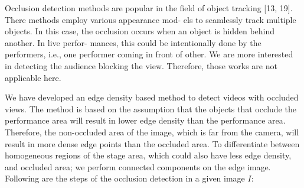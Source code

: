 \documentclass{new}
\begin{document}
Occlusion detection methods are popular in the field of object
tracking [13, 19]. There methods employ various appearance mod-
els to seamlessly track multiple objects. In this case, the occlusion
occurs when an object is hidden behind another. In live perfor-
mances, this could be intentionally done by the performers, i.e.,
one performer coming in front of other. We are more interested in
detecting the audience blocking the view. Therefore, those works
are not applicable here.

We have developed an edge density based method to detect videos
with occluded views. The method is based on the assumption that
the objects that occlude the performance area will result in lower
edge density than the performance area. Therefore, the non-occluded
area of the image, which is far from the camera, will result in more
dense edge points than the occluded area. To differentiate between
homogeneous regions of the stage area, which could also have less
edge density, and occluded area; we perform connected components on the edge image. Following are the steps of the occlusion detection in a given image $\textit{I}$:
\end{document}
